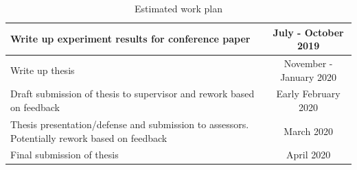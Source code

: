 \documentclass{article} \usepackage{tabularx}
\begin{document}
\begin{table}[H]
\begin{tabularx}{\textwidth}{|X|l|}
			Write up experiment results for conference paper &
                                                         \multicolumn{1}{c|}{July - October 2019}                \\ \hline
			Write up thesis & \multicolumn{1}{c|}{November - January 2020}         \\ \hline
			Draft submission of thesis to supervisor and rework based on feedback                          & \multicolumn{1}{c|}{Early February 2020}              \\ \hline
			Thesis presentation/defense and submission to assessors. Potentially rework based on feedback  & \multicolumn{1}{c|}{March 2020}      		     \\ \hline
			Final submission of thesis                                                                     & \multicolumn{1}{c|}{April 2020}		             \\ \hline
		\end{tabularx}
		\caption{Estimated work plan}
	\end{table}

	
 
\end{document}
